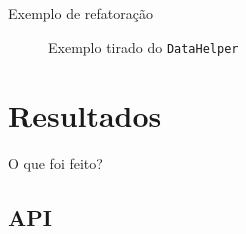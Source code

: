 \documentclass[aspectratio=43,display]{beamer}
\begin{document}
  \begin{frame}{Exemplo de refatoração}
    \begin{figure}
      \centering
      \caption{Exemplo tirado do \texttt{DataHelper}}
    \end{figure}
  \end{frame}

  \section{Resultados}\label{sec:resultados}

  \begin{frame}{O que foi feito?}
    \tableofcontents[currentsection]
  \end{frame}

  \subsection{API}
\end{document}
